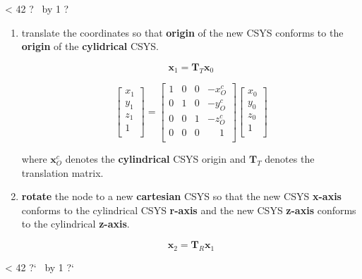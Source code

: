 \documentclass[10pt,b5paper,titlepage]{book}
\newcommand{\m}{\mathbf}
\newcommand{\repeatit}[3][10]{%
    \myloopcounter1%
    \loop\ifnum\myloopcounter < #1
    #2#3%
    \advance\myloopcounter by 1%
    \repeat%
    #2%
}
\newenvironment{qbox}
{
\begin{center}
    \repeatit[42]{?}{\ }
\end{center}
}
{
\begin{center}
    \repeatit[42]{?`}{\ }
\end{center}
}
\begin{document}
\begin{qbox}
     \begin{enumerate}
         \item translate the coordinates so that \textbf{origin} of the new
             CSYS conforms to the \textbf{origin} of the \textbf{cylidrical}
             CSYS.

             \begin{equation}
                 \m{x}_1 = \m{T}_T \m{x}_0
             \end{equation}

             \begin{equation}
                 \begin{bmatrix}
                     x_1 \\
                     y_1 \\
                     z_1 \\
                     1 \\
                 \end{bmatrix}
                 = \begin{bmatrix}
                     1 & 0 & 0 & -x_O^c \\
                     0 & 1 & 0 & -y_O^c \\
                     0 & 0 & 1 & -z_O^c \\
                     0 & 0 & 0 & \phantom{-}1 \\
                 \end{bmatrix}
                 \begin{bmatrix}
                     x_0 \\
                     y_0 \\
                     z_0 \\
                     1 \\
                 \end{bmatrix}
             \end{equation}

             where $ \m{x}_O^c $ denotes the \textbf{cylindrical} CSYS origin
             and $ \m{T}_T $ denotes the translation matrix.

        \item \textbf{rotate} the node to a new \textbf{cartesian} CSYS so that
            the new CSYS \textbf{x-axis} conforms to the cylindrical CSYS
            \textbf{r-axis} and the new CSYS \textbf{z-axis} conforms to the
            cylindrical \textbf{z-axis}.

            \begin{equation}
                \m{x}_2 = \m{T}_R \m{x}_1
            \end{equation}


\end{enumerate}
\end{qbox}
\end{document}
